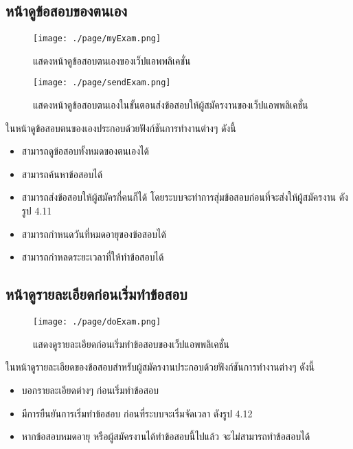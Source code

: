 \subsection{หน้าดูข้อสอบของตนเอง}
\begin{figure}[H]
  \centering
  \texttt{[image: ./page/myExam.png]}
  \caption{แสดงหน้าดูข้อสอบตนเองของเว็ปแอพพลิเคชั่น}
  \label{Fig:myExam}
\end{figure}
\begin{figure}[H]
    \centering
    \texttt{[image: ./page/sendExam.png]}
    \caption{แสดงหน้าดูข้อสอบตนเองในขั้นตอนส่งข้อสอบให้ผู้สมัครงานของเว็ปแอพพลิเคชั่น}
    \label{Fig:sendExam}
  \end{figure}
ในหน้าดูข้อสอบตนของเองประกอบด้วยฟังก์ชันการทำงานต่างๆ ดังนี้
\begin{itemize}
    \item สามารถดูข้อสอบทั้งหมดของตนเองได้
    \item สามารถค้นหาข้อสอบได้
    \item สามารถส่งข้อสอบให้ผู้สมัครกี่คนก็ได้ โดยระบบจะทำการสุ่มข้อสอบก่อนที่จะส่งให้ผู้สมัครงาน ดังรูป 4.11
    \item สามารถกำหนดวันที่หมดอายุของข้อสอบได้
    \item สามารถกำหลดระยะเวลาที่ให้ทำข้อสอบได้
\end{itemize}

\subsection{หน้าดูรายละเอียดก่อนเริ่มทำข้อสอบ}
\begin{figure}[H]
  \centering
  \texttt{[image: ./page/doExam.png]}
  \caption{แสดงดูรายละเอียดก่อนเริ่มทำข้อสอบของเว็ปแอพพลิเคชั่น}
  \label{Fig:doExam}
\end{figure}
ในหน้าดูรายละเอียดของข้อสอบสำหรับผู้สมัครงานประกอบด้วยฟังก์ชันการทำงานต่างๆ ดังนี้
\begin{itemize}
  \item บอกรายละเอียดต่างๆ ก่อนเริ่มทำข้อสอบ
  \item มีการยืนยันการเริ่มทำข้อสอบ ก่อนที่ระบบจะเริ่มจัดเวลา ดังรูป 4.12
  \item หากข้อสอบหมดอายุ หรือผู้สมัครงานได้ทำข้อสอบนี้ไปแล้ว จะไม่สามารถทำข้อสอบได้
\end{itemize}

